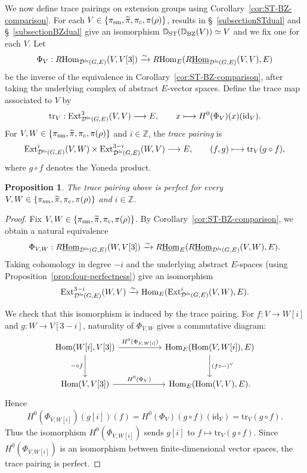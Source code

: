 \documentclass[a4paper,10pt]{amsart}
\theoremstyle{remark}
\theoremstyle{definition}
\theoremstyle{plain}
\newtheorem{proposition}[theorem]{Proposition}
\numberwithin{equation}{section}
\newcommand{\bbD}{{\mathbb D}}
\newcommand{\calD}{{\mathcal D}}
\newcommand{\Ext}{{\rm Ext}}
\newcommand{\Hom}{{\rm Hom}}
\newcommand{\uHom}{\underline{\Hom}}
\newcommand{\la}{{\it la}}
\newcommand{\sm}{{\rm sm}}
\newcommand{\ST}{{\rm ST}}
\newcommand{\trace}{\mathrm{tr}}
\newcommand{\BZ}{\ensuremath{\mathrm{BZ}}}
\begin{document}
We now define trace pairings on extension groups using Corollary~\ref{cor:ST-BZ-comparison}. For each $V\in\{\pi_{\sm},\widetilde\pi,\pi_c,\pi(\rho)\}$, results in \S~\ref{subsectionSTdual} and \S~\ref{subsectionBZdual} give an isomorphism $\bbD_{\ST}(\bbD_{\BZ}(V))\simeq V$ and we fix one for each $V$. Let
\[
 \Phi_V:R\Hom_{\calD^{\la}(G,E)}(V,V[3])\xrightarrow{\sim}R\Hom_E(R\uHom_{\calD^{\la}(G,E)}(V,V),E)
\]
be the inverse of the equivalence in Corollary~\ref{cor:ST-BZ-comparison}, after taking the underlying complex of abstract $E$-vector spaces. Define the trace map associated to $V$ by
\[
 \trace_V:\Ext^3_{\calD^{\la}(G,E)}(V,V)\longrightarrow E,\qquad x\longmapsto H^0(\Phi_V)(x)(\mathrm{id}_V).
\]
For $V,W\in\{\pi_{\sm},\widetilde\pi,\pi_c,\pi(\rho)\}$ and $i\in\mathbb Z$, the \emph{trace pairing} is
\[
 \Ext^i_{\calD^{\la}(G,E)}(V,W)\times\Ext^{3-i}_{\calD^{\la}(G,E)}(W,V)\longrightarrow E,\qquad(f,g)\longmapsto\trace_V(g\circ f),
\]
where $g\circ f$ denotes the Yoneda product. 
\begin{proposition}\label{prop:trace-pairing-perfect}
The trace pairing above is perfect for every $V,W\in\{\pi_{\sm},\widetilde\pi,\pi_c,\pi(\rho)\}$ and $i\in\mathbb Z$.
\end{proposition}
\begin{proof}
Fix $V,W\in\{\pi_{\sm},\widetilde\pi,\pi_c,\pi(\rho)\}$. By Corollary~\ref{cor:ST-BZ-comparison}, we obtain a natural equivalence
\[
 \Phi_{V,W}:R\uHom_{\calD^{\la}(G,E)}(W,V[3])\xrightarrow{\sim}R\uHom_E(R\uHom_{\calD^{\la}(G,E)}(V,W),E).
\]
Taking cohomology in degree $-i$ and the underlying abstract $E$-spaces (using Proposition~\ref{prop:four-perfectness}) give an isomorphism
\[
 \Ext^{3-i}_{\calD^{\la}(G,E)}(W,V)\xrightarrow{\sim}\Hom_E(\Ext^i_{\calD^{\la}(G,E)}(V,W),E).
\]

We check that this isomorphism is induced by the trace pairing. For $f:V\to W[i]$ and $g:W\to V[3-i]$, naturality of $\Phi_{V,W}$ gives a commutative diagram:
\[
\begin{tikzcd}[column sep=5.2em,row sep=large]
	\Hom(W[i],V[3]) \arrow[r,"{H^{0}(\Phi_{V,W[i]})}"] \arrow[d,"{-\circ f}"'] & \Hom_{E}(\Hom(V,W[i]),E) \arrow[d,"{(f\circ-)^{\vee}}"] \\
	\Hom(V,V[3]) \arrow[r,"{H^{0}(\Phi_{V})}"] & \Hom_{E}(\Hom(V,V),E).
\end{tikzcd}
\]
Hence
\[
 H^0(\Phi_{V,W[i]})(g[i])(f)=H^0(\Phi_V)(g\circ f)(\mathrm{id}_V)=\trace_V(g\circ f).
\]
Thus the isomorphism $H^0(\Phi_{V,W[i]})$ sends $g[i]$ to $f\mapsto \trace_V(g\circ f)$. Since $H^0(\Phi_{V,W[i]})$ is an isomorphism between finite-dimensional vector spaces, the trace pairing is perfect.
\end{proof}
\end{document}
